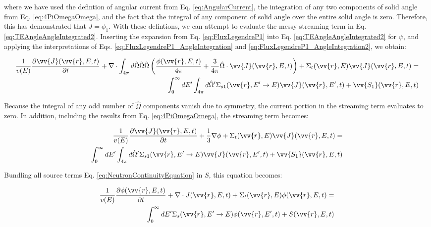 \documentclass[10pt]{article}
\newcommand{\hO}{\hat{\Omega}}
\begin{document}
\begin{flushleft}
where we have used the defintion of angular current from Eq. \ref{eq:AngularCurrent}, the integration of any two components of solid angle from Eq. \ref{eq:4PiOmegaOmega}, and the fact that the integral of any component of solid angle over the entire solid angle is zero. Therefore, this has demonstrated that \(J=\phi_1\). With these defintions, we can attempt to evaluate the messy streaming term in Eq. \ref{eq:TEAngleAngleIntegrated2}. Inserting the expansion from Eq. \ref{eq:FluxLegendreP1} into Eq. \ref{eq:TEAngleAngleIntegrated2} for \(\psi\), and applying the interpretations of Eqs. \ref{eq:FluxLegendreP1_AngleIntegration} and \ref{eq:FluxLegendreP1_AngleIntegration2}, we obtain:

\begin{equation}
\label{eq:P1a}
\begin{aligned}
\frac{1}{v(E)} \frac{\partial\vv{J}(\vv{r}, E, t)}{\partial t} +
 \nabla\cdot \int_{4\pi}^{} d\hO   \hO  \hO  \left(\frac{\phi(\vv{r}, E, t)}{4\pi} + \frac{3}{4\pi} \hO  \cdot\vv{J}(\vv{r}, E, t)\right) + 
 \Sigma_t(\vv{r},E)\vv{J}(\vv{r}, E, t) = \\
 \int_{0}^{\infty}dE' \int_{4\pi}^{ } d\hO  ' \Sigma_{s1}(\vv{r}, E'\rightarrow E)\vv{J}(\vv{r}, E', t) + \vv{S_1}(\vv{r}, E, t)
\end{aligned}
\end{equation}

Because the integral of any odd number of \(\hO  \) components vanish due to symmetry, the current portion in the streaming term evaluates to zero. In addition, including the results from Eq. \ref{eq:4PiOmegaOmega}, the streaming term becomes:

\begin{equation}
\label{eq:P1b}
\begin{aligned}
\frac{1}{v(E)} \frac{\partial\vv{J}(\vv{r}, E, t)}{\partial t} +
 \frac{1}{3}\nabla\phi + 
 \Sigma_t(\vv{r},E)\vv{J}(\vv{r}, E, t) = \\
 \int_{0}^{\infty}dE' \int_{4\pi}^{ } d\hO  ' \Sigma_{s1}(\vv{r}, E'\rightarrow E)\vv{J}(\vv{r}, E', t) + \vv{S_1}(\vv{r}, E, t)
\end{aligned}
\end{equation}

Bundling all source terms Eq. \ref{eq:NeutronContinuityEquation} in \(S\), this equation becomes:

\begin{equation}
\label{eq:NeutronContinuityEquation_BundledSource}
\begin{aligned}
\frac{1}{v(E)} \frac{\partial\phi(\vv{r}, E, t)}{\partial t} +
 \nabla\cdot J(\vv{r}, E, t) + 
 \Sigma_t(\vv{r},E)\phi(\vv{r}, E, t) = \\
 \int_{0}^{\infty}dE' \Sigma_s(\vv{r}, E'\rightarrow E)\phi(\vv{r}, E', t) + S(\vv{r}, E, t)\\
\end{aligned}
\end{equation}


\end{flushleft}
\end{document}
